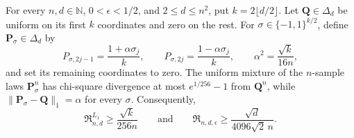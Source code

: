 For every \(n,d\in\mathbb N\), \(0<\epsilon<1/2\), and \(2\le d\le n^2\), put \(k=2\lfloor d/2\rfloor\).  Let \(\mathbf Q\in\Delta_d\) be uniform on its first \(k\) coordinates and zero on the rest.  For \(\sigma\in\{-1,1\}^{k/2}\), define \(\mathbf P_\sigma\in\Delta_d\) by
\[
 P_{\sigma,2j-1}=\frac{1+\alpha\sigma_j}{k},\qquad
 P_{\sigma,2j}=\frac{1-\alpha\sigma_j}{k},
 \qquad
 \alpha^2=\frac{\sqrt{k}}{16n},
\]
and set its remaining coordinates to zero.  The uniform mixture of the \(n\)-sample laws \(\mathbf P_\sigma^n\) has chi-square divergence at most \(e^{1/256}-1\) from \(\mathbf Q^n\), while \(\lVert\mathbf P_\sigma-\mathbf Q\rVert_1=\alpha\) for every \(\sigma\).  Consequently,
\[
 \mathfrak R^{L_1}_{n,d}\ge \frac{\sqrt{k}}{256n}
 \qquad\text{and}\qquad
 \mathfrak R_{n,d,\epsilon}
 \ge \frac{\sqrt d}{4096\sqrt2\,n}.
\]